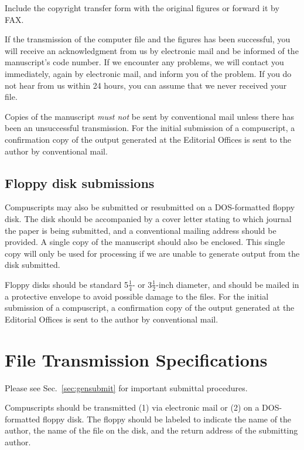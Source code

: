 Include the copyright transfer form with the original figures or forward it
by FAX.

If the transmission of the computer file and the figures has been
successful, you will receive an acknowledgment from us by electronic mail
and be informed of the manuscript's code number. If we encounter any
problems, we will contact you immediately, again by electronic mail, and
inform you of the problem. If you do not hear from us within 24 hours, you
can assume that we never received your file.

Copies of the manuscript {\em must not\/} be sent by conventional mail
unless there has been an unsuccessful transmission. For the initial
submission of a compuscript, a confirmation copy of the output generated at
the Editorial Offices is sent to the author by conventional mail.

\subsection{Floppy disk submissions}

Compuscripts may also be submitted or resubmitted on a DOS-formatted floppy
disk. The disk should be accompanied by a cover letter stating to which
journal the paper is being submitted, and a conventional mailing address
should be provided. A single copy of the manuscript should also be
enclosed. This single copy will only be used for processing if we are
unable to generate output from the disk submitted.

Floppy disks should be standard 5$\frac14$- or 3$\frac12$-inch diameter,
and should be mailed in a protective envelope to avoid possible damage to
the files.  For the initial submission of a compuscript, a confirmation
copy of the output generated at the Editorial Offices is sent to the author
by conventional mail.

\section{File Transmission Specifications}
\label{sec:filesubmit}

Please see Sec.\ \ref{sec:gensubmit} for important submittal procedures.


Compuscripts should be transmitted (1) via electronic mail or (2) on a
DOS-formatted floppy disk. The floppy should be labeled to indicate the
name of the author, the name of the file on the disk, and the return
address of the submitting author.

